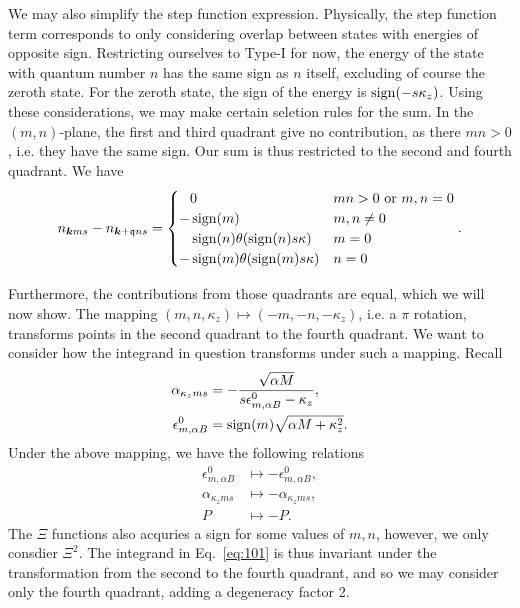 We may also simplify the step function expression.
Physically, the step function term corresponds to only considering overlap between states with energies of opposite sign.
Restricting ourselves to Type-I for now, the energy of the state with quantum number \( n \) has the same sign as \( n \) itself, excluding of course the zeroth state.
For the zeroth state, the sign of the energy is \( \operatorname{sign}(-s \kappa_z) \).
Using these considerations, we may make certain seletion rules for the sum.
In the \( (m,n) \)-plane, the first and third quadrant give no contribution, as there \( m n > 0 \), i.e. they have the same sign.
Our sum is thus restricted to the second and fourth quadrant.
We have
\begin{equation}
  \label{eq:102}
  n_{\bm{k} m s} - n_{\bm{k} + \mathfrak{q} n s} =
  \begin{cases}
    \phantom{-} 0 & m n > 0 \text{ or  } m,n = 0\\
    - \operatorname{sign}(m) & m,n \neq 0\\
    \phantom{-} \operatorname{sign}(n) \theta(\operatorname{sign}(n) s \kappa) & m = 0\\
    -\operatorname{sign}(m) \theta(\operatorname{sign}(m) s \kappa) & n = 0
  \end{cases}.
\end{equation}

Furthermore, the contributions from those quadrants are equal, which we will now show.
The mapping \( (m,n, \kappa_z) \mapsto (-m, -n, -\kappa_z) \), i.e. a \( \pi \) rotation, transforms points in the second quadrant to the fourth quadrant.
We want to consider how the integrand in question transforms under such a mapping.
Recall
\begin{align*}
  \alpha_{\kappa_z m s} &= - \frac{\sqrt{\alpha M} }{s \epsilon_{m, \alpha B}^0 - \kappa_z},\\
  \epsilon_{m, \alpha B}^0 &= \operatorname{sign}(m) \sqrt{\alpha M + \kappa_z^2}.
\end{align*}
Under the above mapping, we have the following relations
\begin{align}
  \label{eq:92}
  \epsilon_{m, \alpha B}^0 &\mapsto -\epsilon_{m, \alpha B}^0,\\
  \alpha_{\kappa_z m s} &\mapsto -\alpha_{\kappa_z m s},\\
  P &\mapsto -P.
\end{align}
The \( \Xi \) functions also acquries a sign for some values of \( m,n \), however, we only consdier \( \Xi^2 \).
The integrand in Eq.~\eqref{eq:101} is thus invariant under the transformation from the second to the fourth quadrant, and so we may consider only the fourth quadrant, adding a degeneracy factor 2.

